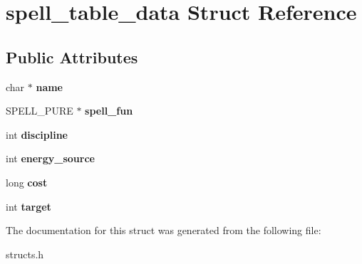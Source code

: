 \hypertarget{structspell__table__data}{\section{spell\-\_\-table\-\_\-data Struct Reference}
\label{structspell__table__data}
}
\subsection*{Public Attributes}
\begin{DoxyCompactItemize}
\item 
\hypertarget{structspell__table__data_a3be3f1a8d33ce0d4c8caf2806ce551c9}{char $\ast$ {\bfseries name}}\label{structspell__table__data_a3be3f1a8d33ce0d4c8caf2806ce551c9}

\item 
\hypertarget{structspell__table__data_a4fd5de4bed0016a1937dd3ed735c1c7d}{S\-P\-E\-L\-L\-\_\-\-P\-U\-R\-E $\ast$ {\bfseries spell\-\_\-fun}}\label{structspell__table__data_a4fd5de4bed0016a1937dd3ed735c1c7d}

\item 
\hypertarget{structspell__table__data_ab86f41a700bbfff8aef37a2e29abc0dc}{int {\bfseries discipline}}\label{structspell__table__data_ab86f41a700bbfff8aef37a2e29abc0dc}

\item 
\hypertarget{structspell__table__data_a8093c61a451186d47de84ededb7b85d8}{int {\bfseries energy\-\_\-source}}\label{structspell__table__data_a8093c61a451186d47de84ededb7b85d8}

\item 
\hypertarget{structspell__table__data_a8593b50ec2569a90656121a6730e3e7d}{long {\bfseries cost}}\label{structspell__table__data_a8593b50ec2569a90656121a6730e3e7d}

\item 
\hypertarget{structspell__table__data_a326a97e0820ab796ed917054bff836d9}{int {\bfseries target}}\label{structspell__table__data_a326a97e0820ab796ed917054bff836d9}

\end{DoxyCompactItemize}


The documentation for this struct was generated from the following file\-:\begin{DoxyCompactItemize}
\item 
structs.\-h\end{DoxyCompactItemize}
